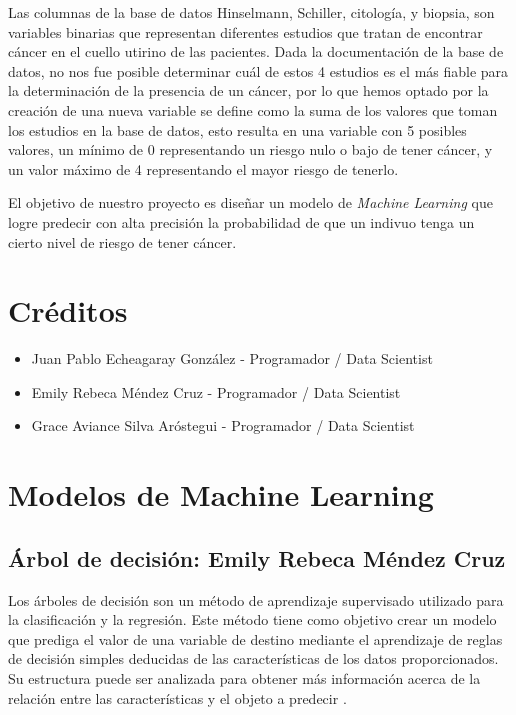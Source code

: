 \documentclass[journal]{IEEEtran}                                                          %
\begin{document}
        Las columnas de la base de datos Hinselmann, Schiller, citología, y biopsia, son variables binarias que representan diferentes estudios que tratan de encontrar cáncer en el cuello utirino de las pacientes. Dada la documentación de la base de datos, no nos fue posible determinar cuál de estos 4 estudios es el más fiable para la determinación de la presencia de un cáncer, por lo que hemos optado por la creación de una nueva variable se define como la suma de los valores que toman los estudios en la base de datos, esto resulta en una variable con 5 posibles valores, un mínimo de 0 representando un riesgo nulo o bajo de tener cáncer, y un valor máximo de 4 representando el mayor riesgo de tenerlo.

        El objetivo de nuestro proyecto es diseñar un modelo de \emph{Machine Learning} que logre predecir con alta precisión la probabilidad de que un indivuo tenga un cierto nivel de riesgo de tener cáncer.
    
    \section{Créditos} \label{credits}
       
        \begin{itemize}
            \item Juan Pablo Echeagaray González - Programador / Data Scientist
            \item Emily Rebeca Méndez Cruz - Programador / Data Scientist
            \item Grace Aviance Silva Aróstegui - Programador / Data Scientist
        \end{itemize}

    \section{Modelos de Machine Learning} \label{modelos}

        \subsection{Árbol de decisión: Emily Rebeca Méndez Cruz} \label{decision-tree}

            Los árboles de decisión son un método de aprendizaje supervisado utilizado para la clasificación y la regresión. Este método tiene como objetivo crear un modelo que prediga el valor de una variable de destino mediante el aprendizaje de reglas de decisión simples deducidas de las características de los datos proporcionados. Su estructura puede ser analizada para obtener más información acerca de la relación entre las características y el objeto a predecir \cite{agencia-b12_2021}.
\end{document}
